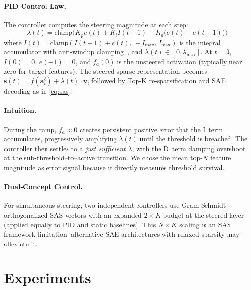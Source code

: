 \documentclass{article}
\theoremstyle{plain}
\begin{document}
\paragraph{PID Control Law.}
The controller computes the steering magnitude at each step:
\begin{equation}
    \lambda(t) = \text{clamp}\!\Big(K_p e(t) + K_i I(t{-}1) + K_d \big(e(t) - e(t{-}1)\big)\Big)
    \label{eq:pid_temporal}
\end{equation}
where $I(t) = \text{clamp}(I(t{-}1) + e(t),\, {-}I_\text{max},\, I_\text{max})$ is the integral accumulator with anti-windup clamping~\cite{astrom1995pid}, and $\lambda(t) \in [0, \lambda_\text{max}]$. At $t{=}0$, $I(0){=}0$, $e(-1){=}0$, and $\bar{f}_a(0)$ is the unsteered activation (typically near zero for target features). The steered sparse representation becomes $\mathbf{s}(t) = f(\mathbf{a}_t^\ell) + \lambda(t) \cdot \mathbf{v}$, followed by Top-K re-sparsification and SAE decoding as in \cref{eq:sas}.

\paragraph{Intuition.}
During the ramp, $\bar{f}_a \approx 0$ creates persistent positive error that the I~term accumulates, progressively amplifying $\lambda(t)$ until the threshold is breached. The controller then settles to a \emph{just sufficient} $\lambda$, with the D~term damping overshoot at the sub-threshold--to--active transition. We chose the mean top-$N$ feature magnitude as error signal because it directly measures threshold survival.


\paragraph{Dual-Concept Control.}
For simultaneous steering, two independent controllers use Gram-Schmidt-orthogonalized SAS vectors with an expanded $2{\times}K$ budget at the steered layer (applied equally to PID and static baselines). This $N{\times}K$ scaling is an SAS framework limitation; alternative SAE architectures with relaxed sparsity may alleviate it.

\section{Experiments}
\label{sec:experiments}
\end{document}
